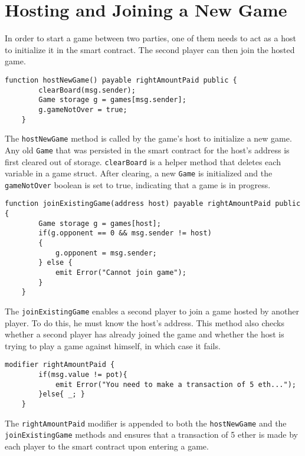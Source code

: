 \documentclass[10pt]{article}
\begin{document}
\section{Hosting and Joining a New Game}

In order to start a game between two parties, one of them needs to act as a host to initialize it in the smart contract. The second player can then join the hosted game.
\begin{Verbatim}[fontsize=\small]
    function hostNewGame() payable rightAmountPaid public {
        clearBoard(msg.sender);
        Game storage g = games[msg.sender];
        g.gameNotOver = true;
    }
\end{Verbatim}
The \texttt{hostNewGame} method is called by the game's host to initialize a new game. Any old \texttt{Game} that was persisted in the smart contract for the host's address is first cleared out of storage. \texttt{clearBoard} is a helper method that deletes each variable in a game struct. After clearing, a new \texttt{Game} is initialized and the \texttt{gameNotOver} boolean is set to true, indicating that a game is in progress.
\begin{Verbatim}[fontsize=\small]
    function joinExistingGame(address host) payable rightAmountPaid public {
        Game storage g = games[host];
        if(g.opponent == 0 && msg.sender != host)
        {
            g.opponent = msg.sender;
        } else {
        	emit Error("Cannot join game");
        }
    }
\end{Verbatim}
The \texttt{joinExistingGame} enables a second player to join a game hosted by another player. To do this, he must know the host's address. This method also checks whether a second player has already joined the game and whether the host is trying to play a game against himself, in which case it fails.
\begin{Verbatim}[fontsize=\small]
    modifier rightAmountPaid {
        if(msg.value != pot){
            emit Error("You need to make a transaction of 5 eth...");
        }else{ _; }
    }
\end{Verbatim}
The \texttt{rightAmountPaid} modifier is appended to both the \texttt{hostNewGame} and the \texttt{joinExistingGame} methods and ensures that a transaction of 5 ether is made by each player to the smart contract upon entering a game.
\end{document}
